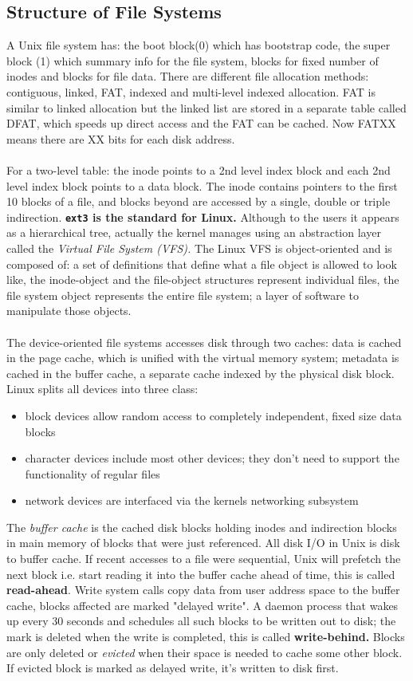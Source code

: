 \documentclass[twoside]{article}
\begin{document}
\subsection{Structure of File Systems}
A Unix file system has: the boot block(0) which has bootstrap code, the super block (1) which summary info for the file system, blocks for fixed number of inodes and blocks for file data. There are different file allocation methods: contiguous, linked, FAT, indexed and multi-level indexed allocation. FAT is similar to linked allocation but the linked list are stored in a separate table called DFAT, which speeds up direct access and the FAT can be cached. Now FATXX means there are XX bits for each disk address.\\ \\
For a two-level table: the inode points to a 2nd level index block and each 2nd level index block points to a data block. The inode contains pointers to the first 10 blocks of a file, and blocks beyond are accessed by a single, double or triple indirection. \textbf{\texttt{ext3} is the standard for Linux.} Although to the users it appears as a hierarchical tree, actually the kernel manages using an abstraction layer called the \emph{Virtual File System (VFS).} The Linux VFS is object-oriented and is composed of: a set of definitions that define what a file object is allowed to look like, the inode-object and the file-object structures represent individual files, the file system object represents the entire file system; a layer of software to manipulate those objects.\\ \\
The device-oriented file systems accesses disk through two caches: data is cached in the page cache, which is unified with the virtual memory system; metadata is cached in the buffer cache, a separate cache indexed by the physical disk block. Linux splits all devices into three class:
\begin{itemize}
\item block devices allow random access to completely independent, fixed size data blocks
\item character devices include most other devices; they don't need to support the functionality of regular files
\item network devices are interfaced via the kernels networking subsystem
\end{itemize}
The \emph{buffer cache} is the cached disk blocks holding inodes and indirection blocks in main memory of blocks that were just referenced. All disk I/O in Unix is disk to buffer cache. If recent accesses to a file were sequential, Unix will prefetch the next block i.e. start reading it into the buffer cache ahead of time, this is called \textbf{read-ahead}. Write system calls copy data from user address space to the buffer cache, blocks affected are marked "delayed write". A daemon process that wakes up every 30 seconds and schedules all such blocks to be written out to disk; the mark is deleted when the write is completed, this is called \textbf{write-behind.} Blocks are only deleted or \emph{evicted} when their space is needed to cache some other block. If evicted block is marked as delayed write, it's written to disk first.\\ \\
\end{document}
